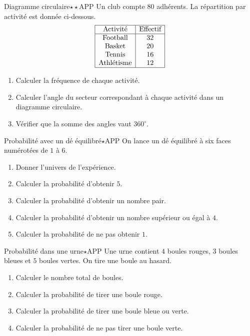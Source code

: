 \documentclass[11pt,a4paper]{article}
\newcounter{exo}
\newcounter{corr}
\begin{document}
\begin{exobox}{Diagramme circulaire}{$\star\star$}{APP}
Un club compte $80$ adhérents. La répartition par activité est donnée ci-dessous.
\[
\begin{array}{|c|c|}
\hline
\text{Activité} & \text{Effectif} \\
\hline
\text{Football} & 32 \\
\text{Basket} & 20 \\
\text{Tennis} & 16 \\
\text{Athlétisme} & 12 \\
\hline
\end{array}
\]
\begin{enumerate}
\item Calculer la fréquence de chaque activité.
\item Calculer l'angle du secteur correspondant à chaque activité dans un diagramme circulaire.
\item Vérifier que la somme des angles vaut $360^\circ$.
\end{enumerate}
\end{exobox}

\begin{exobox}{Probabilité avec un dé équilibré}{$\star$}{APP}
On lance un dé équilibré à six faces numérotées de $1$ à $6$.
\begin{enumerate}
\item Donner l'univers de l'expérience.
\item Calculer la probabilité d'obtenir $5$.
\item Calculer la probabilité d'obtenir un nombre pair.
\item Calculer la probabilité d'obtenir un nombre supérieur ou égal à $4$.
\item Calculer la probabilité de ne pas obtenir $1$.
\end{enumerate}
\end{exobox}

\begin{exobox}{Probabilité dans une urne}{$\star$}{APP}
Une urne contient $4$ boules rouges, $3$ boules bleues et $5$ boules vertes. On tire une boule au hasard.
\begin{enumerate}
\item Calculer le nombre total de boules.
\item Calculer la probabilité de tirer une boule rouge.
\item Calculer la probabilité de tirer une boule bleue ou verte.
\item Calculer la probabilité de ne pas tirer une boule verte.
\end{enumerate}
\end{exobox}
\end{document}
